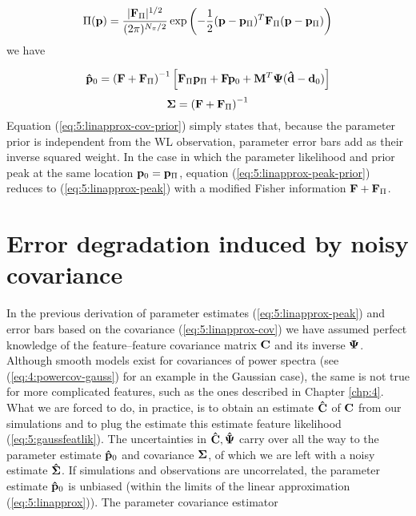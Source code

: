 \begin{equation}
\label{eq:5:gaussprior}
\Pi(\mathbf{p}) = \frac{\vert\mathbf{F}_\Pi\vert^{1/2}}{(2\pi)^{N_\pi/2}}\exp\left(-\frac{1}{2}(\mathbf{p}-\mathbf{p}_\Pi)^T\mathbf{F}_\Pi(\mathbf{p}-\mathbf{p}_\Pi)\right)
\end{equation}
%
we have 

\begin{equation}
\label{eq:5:linapprox-peak-prior}
\mathbf{\hat{p}}_0 = \left(\mathbf{F}+\mathbf{F}_\Pi\right)^{-1}\left[\mathbf{F}_\Pi\mathbf{p}_\Pi + \mathbf{F}\mathbf{p}_0 + \mathbf{M}^T\mathbf{\Psi}(\mathbf{\hat{d}}-\mathbf{d}_0) \right]
\end{equation}
%
\begin{equation}
\label{eq:5:linapprox-cov-prior}
\mathbf{\Sigma} = \left(\mathbf{F}+\mathbf{F}_\Pi\right)^{-1} 
\end{equation}
%
Equation (\ref{eq:5:linapprox-cov-prior}) simply states that, because the parameter prior is independent from the WL observation, parameter error bars add as their inverse squared weight. In the case in which the parameter likelihood and prior peak at the same location $\mathbf{p}_0=\mathbf{p}_\Pi$, equation (\ref{eq:5:linapprox-peak-prior}) reduces to (\ref{eq:5:linapprox-peak}) with a modified Fisher information $\mathbf{F}+\mathbf{F}_\Pi$.    

\section{Error degradation induced by noisy covariance}
\label{sec:5:degrade}
In the previous derivation of parameter estimates (\ref{eq:5:linapprox-peak}) and error bars based on the covariance (\ref{eq:5:linapprox-cov}) we have assumed perfect knowledge of the feature--feature covariance matrix $\mathbf{C}$ and its inverse $\mathbf{\Psi}$. Although smooth models exist for covariances of power spectra (see (\ref{eq:4:powercov-gauss}) for an example in the Gaussian case), the same is not true for more complicated features, such as the ones described in Chapter \ref{chp:4}. What we are forced to do, in practice, is to obtain an estimate $\mathbf{\hat{C}}$ of $\mathbf{C}$ from our simulations and to plug the estimate this estimate feature likelihood (\ref{eq:5:gaussfeatlik}). The uncertainties in $\mathbf{\hat{C}},\mathbf{\hat{\Psi}}$ carry over all the way to the parameter estimate $\mathbf{\hat{p}}_0$ and covariance $\mathbf{\Sigma}$, of which we are left with a noisy estimate $\mathbf{\hat{\Sigma}}$. If simulations and observations are uncorrelated, the parameter estimate $\mathbf{\hat{p}}_0$ is unbiased (within the limits of the linear approximation (\ref{eq:5:linapprox})). The parameter covariance estimator


